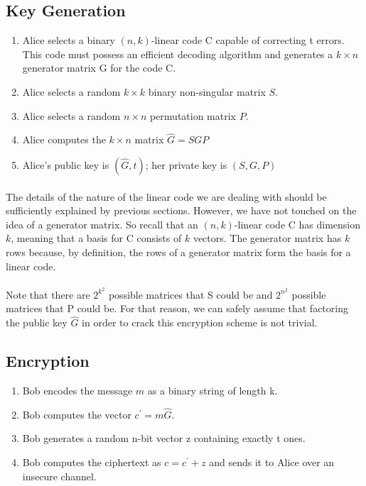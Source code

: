 \documentclass{article}
\theoremstyle{definition}
\begin{document}
	\subsection{Key Generation}
	\begin{enumerate}[1)]
		\item Alice selects a binary $(n,k)$-linear code C capable of correcting t errors. This code must possess an efficient decoding algorithm and generates a $k \times n$ generator matrix G for the code C.
		
		\item Alice selects a random $k \times k$ binary non-singular matrix $S$.
		
		\item Alice selects a random $n \times n$ permutation matrix $P$.
		
		\item Alice computes the $k \times n$ matrix ${\hat G} = SGP$
		
		\item Alice's public key is $({\hat G}, t)$; her private key is $(S, G, P)$
	\end{enumerate}	 	

	\paragraph{} The details of the nature of the linear code we are dealing with should be sufficiently explained by previous sections.  However, we have not touched on the idea of a generator matrix.  So recall that an $(n,k)$-linear code C has dimension $k$, meaning that a basis for C consists of $k$ vectors.  The generator matrix has $k$ rows because, by definition, the rows of a generator matrix form the basis for a linear code.  
	\paragraph{} Note that there are $2^{k^2}$ possible matrices that S could be and $2^{n^2}$ possible matrices that P could be.  For that reason, we can safely assume that factoring the public key ${\hat G}$ in order to crack this encryption scheme is not trivial.
	
	\subsection{Encryption}
	\begin{enumerate}[1)]
	\item Bob encodes the message $m$ as a binary string of length k.
	\item Bob computes the vector $c^{\prime} = m{\hat G}$.
	\item Bob generates a random n-bit vector z containing exactly t ones.
	\item Bob computes the ciphertext as $c = c^{\prime} + z$ and sends it to Alice over an insecure channel.  	
	\end{enumerate}	
\end{document}
